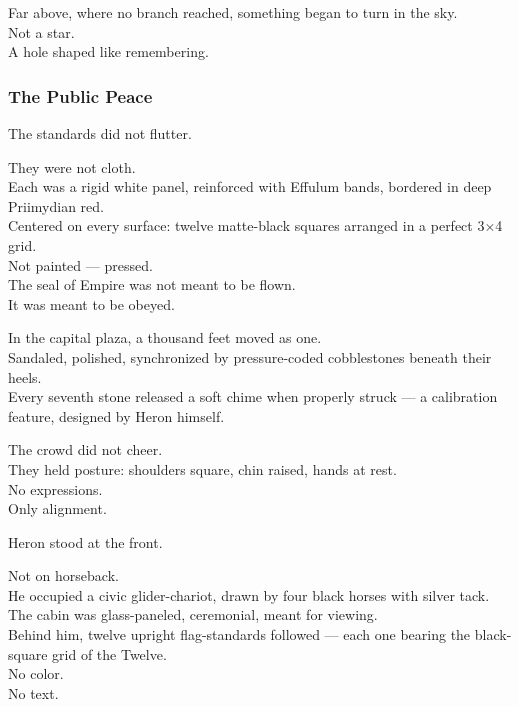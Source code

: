 \documentclass[12pt]{article}
\begin{document}
\vspace{1em}

Far above, where no branch reached, something began to turn in the sky.\\
Not a star.\\
A hole shaped like remembering.

\dotfill

\subsubsection*{The Public Peace}

The standards did not flutter.

They were not cloth.\\
Each was a rigid white panel, reinforced with Effulum bands, bordered in deep Priimydian red.\\
Centered on every surface: twelve matte-black squares arranged in a perfect 3×4 grid.\\
Not painted — pressed.\\
The seal of Empire was not meant to be flown.\\
It was meant to be obeyed.

\vspace{1em}

In the capital plaza, a thousand feet moved as one.\\
Sandaled, polished, synchronized by pressure-coded cobblestones beneath their heels.\\
Every seventh stone released a soft chime when properly struck — a calibration feature, designed by Heron himself.

The crowd did not cheer.\\
They held posture: shoulders square, chin raised, hands at rest.\\
No expressions.\\
Only alignment.

Heron stood at the front.

Not on horseback.\\
He occupied a civic glider-chariot, drawn by four black horses with silver tack.\\
The cabin was glass-paneled, ceremonial, meant for viewing.\\
Behind him, twelve upright flag-standards followed — each one bearing the black-square grid of the Twelve.\\
No color.\\
No text.
\end{document}
